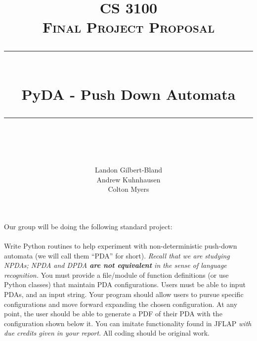 \documentclass[a4paper]{report}
\newcommand{\HRule}{\rule{\linewidth}{0.5mm}}
\begin{document}
\title{ %
    \textsc{\LARGE CS 3100}\\[1.5cm]
    \textsc{\Large Final Project Proposal}\\[0.5cm]
    \HRule \\[0.4cm]
    { \huge \bfseries PyDA - Push Down Automata}\\
    \HRule \\[1.5cm]
}
\author{
    Landon Gilbert-Bland\\
    Andrew Kuhnhausen\\
    Colton Myers\\
}
\maketitle

Our group will be doing the following standard project:\\\\
\vbox{
Write Python routines to help experiment with non-deterministic push-down
automata (we will call them ``PDA'' for short). {\em Recall that we are studying
NPDAs; NPDA and DPDA {\bf are not equivalent} in the sense of language
recognition.} You must provide a file/module of function definitions (or use
Python classes) that maintain PDA configurations. Users must be able to input
PDAs, and an input string. Your program should allow users to pursue specific
configurations and move forward expanding the chosen configuration. At any
point, the user should be able to generate a PDF of their PDA with the
configuration shown below it. You can imitate functionality found in JFLAP {\em
with due credits given in your report}. All coding should be original work.
}
\end{document}
